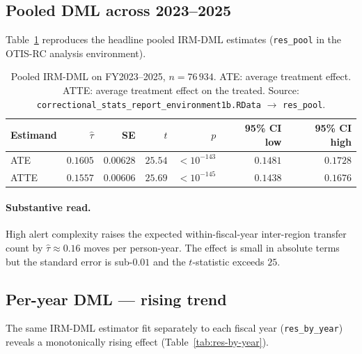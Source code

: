 \documentclass[11pt,a4paper]{article}
\newcommand{\1}{\mathbf{1}}
\theoremstyle{plain}
\theoremstyle{definition}
\begin{document}
\subsection{Pooled DML across 2023--2025}\label{sec:pooled}

Table~\ref{tab:res-pool} reproduces the headline pooled IRM-DML
estimates (\texttt{res\_pool} in the OTIS-RC analysis environment).

\begin{table}[h]
\centering\small
\caption{Pooled IRM-DML on FY2023--2025, $n=76\,934$.  ATE: average
treatment effect.  ATTE: average treatment effect on the treated.
Source: \texttt{correctional\_stats\_report\_environment1b.RData}
$\to$ \texttt{res\_pool}.}\label{tab:res-pool}
\begin{tabular}{lrrrrrr}
\toprule
Estimand & $\widehat\tau$ & SE & $t$ & $p$ & 95\% CI low & 95\% CI high\\\midrule
ATE  & $0.1605$ & $0.00628$ & $25.54$ & $<10^{-143}$ & $0.1481$ & $0.1728$\\
ATTE & $0.1557$ & $0.00606$ & $25.69$ & $<10^{-145}$ & $0.1438$ & $0.1676$\\
\bottomrule
\end{tabular}
\end{table}

\paragraph{Substantive read.}  High alert complexity raises the
expected within-fiscal-year inter-region transfer count by
$\widehat\tau \approx 0.16$ moves per person-year.  The effect is
small in absolute terms but the standard error is sub-$0.01$ and the
$t$-statistic exceeds $25$.

\subsection{Per-year DML — rising trend}\label{sec:per-year}

The same IRM-DML estimator fit separately to each fiscal year
(\texttt{res\_by\_year}) reveals a monotonically rising effect
(Table~\ref{tab:res-by-year}).
\end{document}
